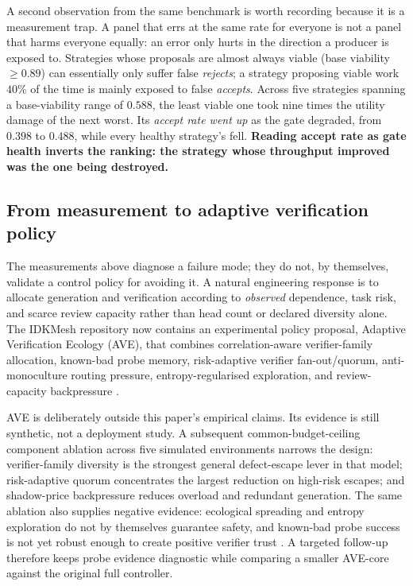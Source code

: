 \documentclass[11pt,a4paper]{article}
\begin{document}
A second observation from the same benchmark is worth recording because it is a
measurement trap. A panel that errs at the same rate for everyone is not a panel
that harms everyone equally: an error only hurts in the direction a producer is
exposed to. Strategies whose proposals are almost always viable (base viability
$\geq 0.89$) can essentially only suffer false \emph{rejects}; a strategy
proposing viable work $40\%$ of the time is mainly exposed to false
\emph{accepts}. Across five strategies spanning a base-viability range of
$0.588$, the least viable one took nine times the utility damage of the next
worst. Its \emph{accept rate went up} as the gate degraded, from $0.398$ to
$0.488$, while every healthy strategy's fell. \textbf{Reading accept rate as gate
health inverts the ranking: the strategy whose throughput improved was the one
being destroyed.}

\subsection{From measurement to adaptive verification policy}
\label{sec:avefuture}

The measurements above diagnose a failure mode; they do not, by themselves,
validate a control policy for avoiding it. A natural engineering response is to
allocate generation and verification according to \emph{observed} dependence,
task risk, and scarce review capacity rather than head count or declared
diversity alone. The IDKMesh repository now contains an experimental policy
proposal, Adaptive Verification Ecology (AVE), that combines
correlation-aware verifier-family allocation, known-bad probe memory,
risk-adaptive verifier fan-out/quorum, anti-monoculture routing pressure,
entropy-regularised exploration, and review-capacity backpressure
\citep{idkmesh}.

AVE is deliberately outside this paper's empirical claims. Its evidence is
still synthetic, not a deployment study. A subsequent common-budget-ceiling
component ablation across five simulated environments narrows the design:
verifier-family diversity is the strongest general defect-escape lever in that
model; risk-adaptive quorum concentrates the largest reduction on high-risk
escapes; and shadow-price backpressure reduces overload and redundant generation.
The same ablation also supplies negative evidence: ecological spreading and
entropy exploration do not by themselves guarantee safety, and known-bad probe
success is not yet robust enough to create positive verifier trust
\citep{idkmesh}. A targeted follow-up therefore keeps probe evidence diagnostic
while comparing a smaller AVE-core against the original full controller.
\end{document}
